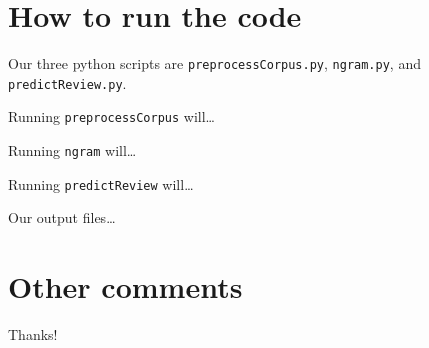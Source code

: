 \documentclass{article}
\begin{document}
\section{How to run the code}
Our three python scripts are \texttt{preprocessCorpus.py}, \texttt{ngram.py}, and \texttt{predictReview.py}.\par
Running \texttt{preprocessCorpus} will\ldots\par
Running \texttt{ngram} will\ldots\par
Running \texttt{predictReview} will\ldots\par

Our output files\ldots

\lipsum[4]

\section{Other comments}
Thanks!
\end{document}
